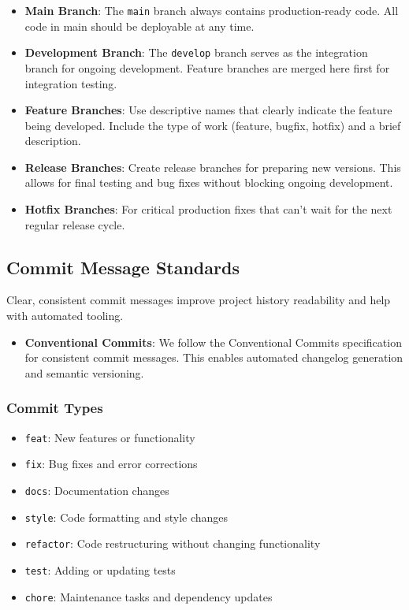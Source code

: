 \documentclass[12pt]{article}
\begin{document}
\begin{itemize}
    \item \textbf{Main Branch}: The \texttt{main} branch always contains production-ready code. All code in main should be deployable at any time.
    
    \item \textbf{Development Branch}: The \texttt{develop} branch serves as the integration branch for ongoing development. Feature branches are merged here first for integration testing.
    
    \item \textbf{Feature Branches}: Use descriptive names that clearly indicate the feature being developed. Include the type of work (feature, bugfix, hotfix) and a brief description.
    
    \item \textbf{Release Branches}: Create release branches for preparing new versions. This allows for final testing and bug fixes without blocking ongoing development.
    
    \item \textbf{Hotfix Branches}: For critical production fixes that can't wait for the next regular release cycle.
\end{itemize}

\subsection{Commit Message Standards}
Clear, consistent commit messages improve project history readability and help with automated tooling.

\begin{itemize}
    \item \textbf{Conventional Commits}: We follow the Conventional Commits specification for consistent commit messages. This enables automated changelog generation and semantic versioning.
\end{itemize}

\subsubsection{Commit Types}
\begin{itemize}
    \item \texttt{feat}: New features or functionality
    \item \texttt{fix}: Bug fixes and error corrections
    \item \texttt{docs}: Documentation changes
    \item \texttt{style}: Code formatting and style changes
    \item \texttt{refactor}: Code restructuring without changing functionality
    \item \texttt{test}: Adding or updating tests
    \item \texttt{chore}: Maintenance tasks and dependency updates
\end{itemize}
\end{document}
